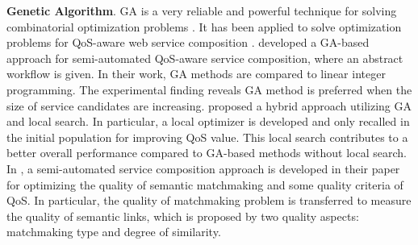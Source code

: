 \textbf{Genetic Algorithm}. 
GA is a very reliable and powerful technique for solving combinatorial optimization problems \cite{srinivas1994genetic}. It has been applied to solve optimization problems for QoS-aware web service composition \cite{wang2012survey}. \cite{canfora2005approach} developed a GA-based approach for semi-automated QoS-aware service composition, where an abstract workflow is given. In their work, GA methods are compared to linear integer programming. The experimental finding reveals GA method is preferred when the size of service candidates are increasing.  \cite{tang2010hybrid} proposed a hybrid approach utilizing GA and local search. In particular, a local optimizer is developed and only recalled in the initial population for improving QoS value. This local search contributes to a better overall performance compared to GA-based methods without local search. In \cite{lecue2009optimizing},  a semi-automated service composition approach is developed in their paper for optimizing the quality of semantic matchmaking and some quality criteria of QoS. In particular, the quality of matchmaking problem is transferred to measure the quality of semantic links, which is proposed by two quality aspects: matchmaking type and degree of similarity.

